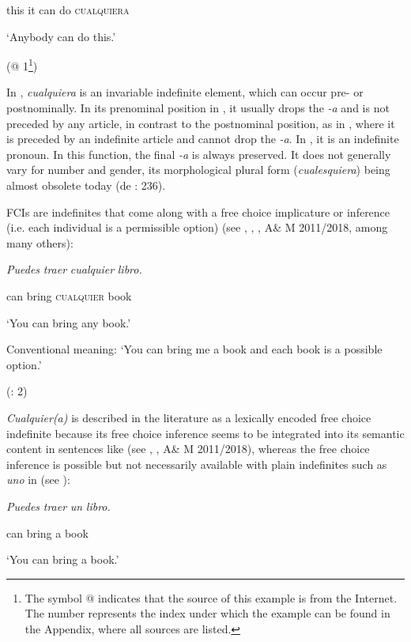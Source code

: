 \documentclass[output=paper]{langscibook}
\begin{document}
    this  it  can  do  \textsc{cualquiera}  

    ‘Anybody can do this.’

    (@ 1\footnote{ \textrm{The symbol @ indicates that the source of this example is from the Internet. The number represents the index under which the example can be found in the Appendix, where all sources are listed.}})

In , \textit{cualquiera} is an invariable indefinite element, which can occur pre- or postnominally. In its prenominal position in , it usually drops the \textit{{}-a} and is not preceded by any article, in contrast to the postnominal position, as in , where it is preceded by an indefinite article and cannot drop the \textit{{}-a}. In , it is an indefinite pronoun. In this function, the final \textit{{}-a} is always preserved. It does not generally vary for number and gender, its morphological plural form (\textit{cualesquiera}) being almost obsolete today (de \citealt{Bruyne2011}: 236).

FCIs are indefinites that come along with a free choice implicature or inference (i.e. each individual is a permissible option) (see \citealt{Arregui2006}, \citealt{AloniPort2013}, \citealt{Aloni2021}, A\& M 2011/2018, among many others): 

    \textit{Puedes}  \textit{traer}  \textit{cualquier}  \textit{libro.}    

    can  bring  \textsc{cualquier}  book    

    ‘You can bring any book.’

    Conventional meaning: ‘You can bring me a book and each book is a possible option.’

    (\citealt{AloniEtAl2011}: 2)

\textit{Cualquier(a)} is described in the literature as a lexically encoded free choice indefinite because its free choice inference seems to be integrated into its semantic content in sentences like  (see \citealt{AloniPort2013}, \citealt{Aloni2021}, A\& M 2011/2018), whereas the free choice inference is possible but not necessarily available with plain indefinites such as \textit{uno} in  (see \citealt{Aloni2021}):

    \textit{Puedes}  \textit{traer}  \textit{un}  \textit{libro.}    

    can  bring  a  book    

    ‘You can bring a book.’
\end{document}
